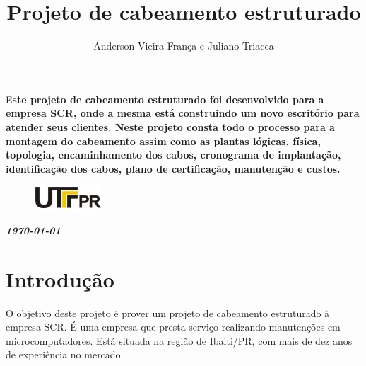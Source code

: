 \documentclass[	DIV=calc,%
							paper=a4,%
							fontsize=12pt,%
							onecolumn]{scrartcl}	 					%
\title{Projeto de cabeamento estruturado}					%
\author{Anderson Vieira França e Juliano Triacca}  	%
\date{}																				%
\newcommand{\initial}[1]{%
     \lettrine[lines=3,lhang=0.3,nindent=0em]{
     				\color{DarkGoldenrod}
     				{\textsf{#1}}}{}}
\begin{document}
\maketitle
\thispagestyle{fancy} 	
\thispagestyle{empty}		%




\initial{E}\textbf{ste projeto de cabeamento estruturado foi desenvolvido para a empresa SCR, onde a mesma está construindo um novo escritório para atender seus clientes. Neste projeto consta todo o processo para a montagem do cabeamento assim como as plantas lógicas, física, topologia, encaminhamento dos cabos, cronograma de implantação, identificação dos cabos, plano de certificação, manutenção e custos.}

\begin{figure}
	\centering
	\includegraphics{utfpr}
\end{figure}

\vspace{3cm}
\centerline{\textit{\textbf{\today}}}

\clearpage
    \renewcommand*\listfigurename{Lista de figuras}
\listoffigures

\renewcommand*\listtablename{Lista de tabelas}
\listoftables




\clearpage
\renewcommand{\contentsname}{Sumário}
\tableofcontents
\clearpage

\section{Introdução}

O objetivo deste projeto é prover um projeto de cabeamento estruturado à empresa SCR. É  uma empresa que presta serviço realizando manutenções em microcomputadores. Está situada na região de Ibaiti/PR, com mais de dez anos de experiência no mercado. 
\end{document}
